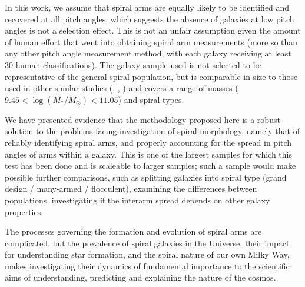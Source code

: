 In this work, we assume that spiral arms are equally likely to be identified and recovered at all pitch angles, which suggests the absence of galaxies at low pitch angles is not a selection effect. This is not an unfair assumption given the amount of human effort that went into obtaining spiral arm measurements (more so than any other pitch angle measurement method, with each galaxy receiving at least 30 human classifications). The galaxy sample used is not selected to be representative of the general spiral population, but is comparable in size to those used in other similar studies (\citealt{2013MNRAS.436.1074S}, \citealt{2019ApJ...871..194Y}, \citealt{2019arXiv190910291P}) and covers a range of masses ($9.45 < \log(M_* / M_\odot) < 11.05$) and spiral types.

We have presented evidence that the methodology proposed here is a robust solution to the problems facing investigation of spiral morphology, namely that of reliably identifying spiral arms, and properly accounting for the spread in pitch angles of arms within a galaxy. This is one of the largest samples for which this test has been done and is scaleable to larger samples; such a sample would make possible further comparisons, such as splitting galaxies into spiral type (grand design / many-armed / flocculent), examining the differences between populations, investigating if the interarm spread depends on other galaxy properties.

The processes governing the formation and evolution of spiral arms are complicated, but the prevalence of spiral galaxies in the Universe, their impact for understanding star formation, and the spiral nature of our own Milky Way, makes investigating their dynamics of fundamental importance to the scientific aims of understanding, predicting and explaining the nature of the cosmos.
